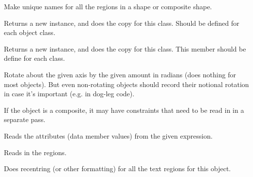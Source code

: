
Make unique names for all the regions in a shape or composite shape.



Returns a new instance, and does the copy for this class. Should be
defined for each object class.



Returns a new instance, and does the copy for this class. This member
should be define for each class.



Rotate about the given axis by the given amount in radians (does nothing
for most objects). But even non-rotating objects should record their
notional rotation in case it's important (e.g. in dog-leg code). 



If the object is a composite, it may have constraints that need to be read in in a separate pass.



Reads the attributes (data member values) from the given expression.



Reads in the regions.



Does recentring (or other formatting) for all the text regions for this object.




